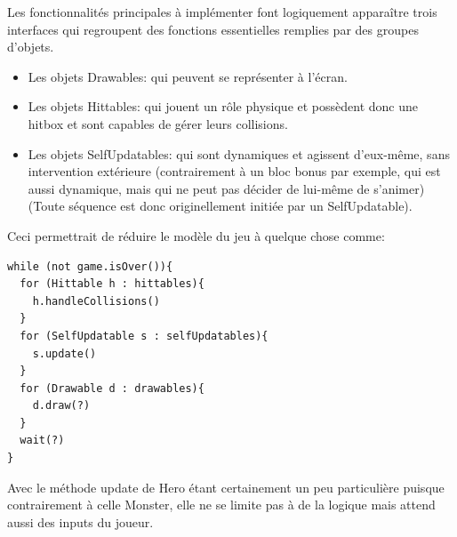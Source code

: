\documentclass[a4paper, 12pt]{article}
\begin{document}
Les fonctionnalités principales à implémenter font logiquement apparaître trois interfaces qui regroupent des fonctions essentielles remplies par des groupes d'objets.
\begin{itemize}
  \item Les objets Drawables: qui peuvent se représenter à l'écran.
  \item Les objets Hittables: qui jouent un rôle physique et possèdent donc une hitbox et sont capables de gérer leurs collisions.
  \item Les objets SelfUpdatables: qui sont dynamiques et agissent d'eux-même, sans intervention extérieure (contrairement à un bloc bonus par exemple, qui est aussi dynamique, mais qui ne peut pas décider de lui-même de s'animer)(Toute séquence est donc originellement initiée par un SelfUpdatable).
\end{itemize}

Ceci permettrait de réduire le modèle du jeu à quelque chose comme:

\begin{lstlisting}
while (not game.isOver()){
  for (Hittable h : hittables){
    h.handleCollisions()
  }
  for (SelfUpdatable s : selfUpdatables){
    s.update()
  }
  for (Drawable d : drawables){
    d.draw(?)
  }
  wait(?)
}
\end{lstlisting}

Avec le méthode update de Hero étant certainement un peu particulière puisque contrairement à celle Monster, elle ne se limite pas à de la logique mais attend aussi des inputs du joueur.
\end{document}
